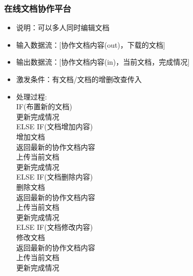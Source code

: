             \subsubsection{在线文档协作平台}
            \begin{itemize}
                \item 说明：可以多人同时编辑文档
                \item 输入数据流：[协作文档内容(out)，下载的文档]
                \item 输出数据流：[协作文档内容(in)，当前文档，完成情况]
                \item 激发条件：有文档/文档的增删改查传入
                \item 处理过程: \\
                IF(布置新的文档)\\
                    更新完成情况\\
                ELSE IF(文档增加内容)\\
                    增加文档\\
                    返回最新的协作文档内容\\
                    上传当前文档\\
                    更新完成情况\\
                ELSE IF(文档删除内容)\\
                    删除文档\\
                    返回最新的协作文档内容\\
                    上传当前文档\\
                    更新完成情况\\
                ELSE IF(文档修改内容)\\
                    修改文档\\
                    返回最新的协作文档内容\\
                    上传当前文档\\
                    更新完成情况\\
            \end{itemize}
